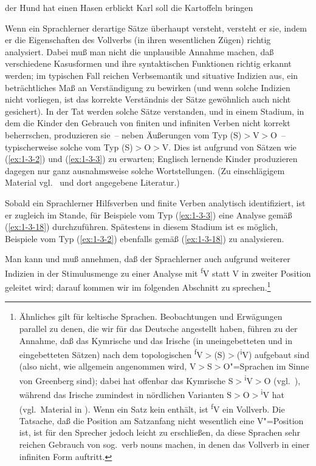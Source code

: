 \documentclass[output=paper]{langsci/langscibook}
\begin{document}
\begin{exe}
\makeatletter{}\label{ex:1-3-3-2}\makeatother
\begin{xlist}
\ex\label{ex:1-3-3a-2} der Hund hat einen Hasen erblickt
\ex\label{ex:1-3-3b-2} Karl soll die Kartoffeln bringen
\end{xlist}
\end{exe}
Wenn ein Sprachlerner derartige Sätze überhaupt versteht, versteht er
sie, indem er die Eigenschaften des Vollverbs (in ihren wesentlichen
Zügen) richtig analysiert. Dabei muß man nicht die unplausible Annahme
machen, daß verschiedene Kasusformen und ihre syntaktischen Funktionen
richtig erkannt werden; im typischen Fall reichen Verbsemantik und
situative Indizien aus, ein beträchtliches Maß an Verständigung zu
bewirken (und wenn solche Indizien nicht vorliegen, ist das korrekte
Verständnis der Sätze gewöhnlich auch nicht gesichert). In der Tat
werden solche Sätze verstanden, und in einem Stadium, in dem die
Kinder den Gebrauch von finiten und infiniten Verben nicht korrekt
beherrschen, produzieren sie~-- neben Äußerungen vom Typ
(S)$>$V$>$O~-- typischerweise solche vom Typ (S)$>$O$>$V. Dies ist
aufgrund von Sätzen wie (\ref{ex:1-3-2}) und (\ref{ex:1-3-3}) zu
erwarten; Englisch lernende Kinder produzieren dagegen nur ganz
ausnahmsweise solche Wortstellungen. (Zu einschlägigem Material
vgl.\ \citet{Park1981} und dort angegebene Literatur.)

Sobald ein Sprachlerner Hilfsverben und finite Verben analytisch
identifiziert, ist er zugleich im Stande, für Beispiele vom Typ
(\ref{ex:1-3-3}) eine Analyse gemäß (\ref{ex:1-3-18})
durchzuführen. Spätestens in diesem Stadium ist es möglich, Beispiele
vom Typ (\ref{ex:1-3-2}) ebenfalls gemäß (\ref{ex:1-3-18}) zu
analysieren.

Man kann und muß annehmen, daß der Sprachlerner auch aufgrund weiterer Indizien in der Stimulusmenge zu einer Analyse mit \textsuperscript{f}V statt V in zweiter Position
geleitet wird; darauf kommen wir im folgenden Abschnitt zu sprechen.\footnote{%
  Ähnliches gilt für keltische Sprachen. Beobachtungen und Erwägungen parallel zu denen, die wir für
  das Deutsche angestellt haben, führen zu der Annahme, daß das Kymrische und das Irische (in
  uneingebetteten und in eingebetteten Sätzen) nach dem topologischen 
  \textsuperscript{f}V$>$(S)$>$(\textsuperscript{i}V) aufgebaut sind (also nicht, wie allgemein
  angenommen wird, V$>$S$>$O"=Sprachen im Sinne von Greenberg sind); dabei hat offenbar das Kymrische
  S$>$\textsuperscript{i}V$>$O (vgl.\ \citealt{JonesThomas1977}), während das Irische zumindest in
  nördlichen Varianten S$>$O$>$\textsuperscript{i}V hat (vgl.\ Material in
  \citet{McCloskey1980}). Wenn ein Satz kein  enthält, ist \textsuperscript{f}V ein
  Vollverb. Die Tatsache, daß die Position am Satzanfang nicht wesentlich eine V"=Position ist, ist
  für den Sprecher jedoch leicht zu erschließen, da diese Sprachen sehr reichen Gebrauch von
  sog.\ verb nouns machen, in denen das Vollverb in einer infiniten Form auftritt.\label{fn:10}%
}
\end{document}

